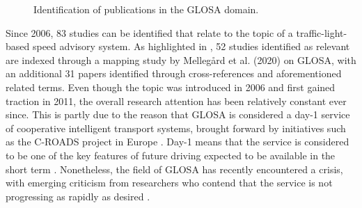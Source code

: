 \begin{figure}[t]
\centering
{}
\caption{Identification of publications in the GLOSA domain.}
\label{fig:related-work-research-method}
\end{figure}

Since 2006, 83 studies can be identified that relate to the topic of a traffic-light-based speed advisory system. As highlighted in , 52 studies identified as relevant are indexed through a mapping study by Mellegård et al. (2020) \cite{mellegard_day_2020} on GLOSA, with an additional 31 papers identified through cross-references and aforementioned related terms. Even though the topic was introduced in 2006 and first gained traction in 2011, the overall research attention has been relatively constant ever since. This is partly due to the reason that GLOSA is considered a day-1 service of cooperative intelligent transport systems, brought forward by initiatives such as the C-ROADS project in Europe \cite{sharara_impact_2019}. Day-1 means that the service is considered to be one of the key features of future driving expected to be available in the short term \cite{mellegard_day_2020}. Nonetheless, the field of GLOSA has recently encountered a crisis, with emerging criticism from researchers who contend that the service is not progressing as rapidly as desired \cite{mellegard_day_2020, otto_framework_2023}.

